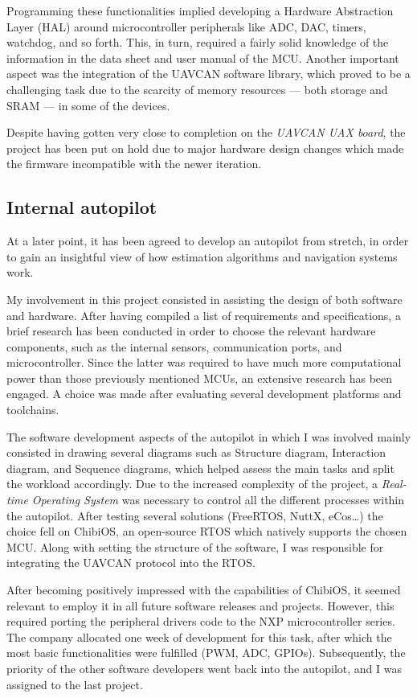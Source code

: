 Programming these functionalities implied developing a Hardware Abstraction Layer (HAL) around microcontroller peripherals like ADC, DAC, timers, watchdog, and so forth.
This, in turn, required a fairly solid knowledge of the information in the data sheet and user manual of the MCU.
Another important aspect was the integration of the UAVCAN software library, which proved to be a challenging task due to the scarcity of memory resources --- both storage and SRAM --- in some of the devices.

Despite having gotten very close to completion on the \emph{UAVCAN UAX board}, the project has been put on hold due to major hardware design changes which made the firmware incompatible with the newer iteration.


\subsection{Internal autopilot}
At a later point, it has been agreed to develop an autopilot from stretch, in order to gain an insightful view of how estimation algorithms and navigation systems work.

My involvement in this project consisted in assisting the design of both software and hardware.
After having compiled a list of requirements and specifications, a brief research has been conducted in order to choose the relevant hardware components, such as the internal sensors, communication ports, and microcontroller.
Since the latter was required to have much more computational power than those previously mentioned MCUs, an extensive research has been engaged.
A choice was made after evaluating several development platforms and toolchains.

The software development aspects of the autopilot in which I was involved mainly consisted in drawing several diagrams such as Structure diagram, Interaction diagram, and Sequence diagrams, which helped assess the main tasks and split the workload accordingly.
Due to the increased complexity of the project, a \emph{Real-time Operating System} was necessary to control all the different processes within the autopilot.
After testing several solutions (FreeRTOS, NuttX, eCos\dots) the choice fell on ChibiOS, an open-source RTOS which natively supports the chosen MCU.
Along with setting the structure of the software, I was responsible for integrating the UAVCAN protocol into the RTOS.

After becoming positively impressed with the capabilities of ChibiOS, it seemed relevant to employ it in all future software releases and projects.
However, this required porting the peripheral drivers code to the NXP microcontroller series.
The company allocated one week of development for this task, after which the most basic functionalities were fulfilled (PWM, ADC, GPIOs).
Subsequently, the priority of the other software developers went back into the autopilot, and I was assigned to the last project.


